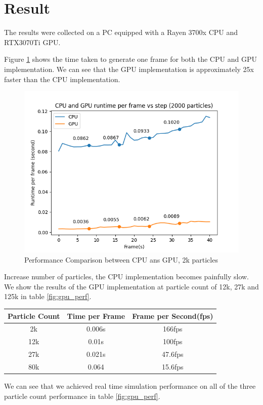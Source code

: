 \documentclass[sigconf]{acmart}
\begin{document}
\section{Result}
The results were collected on a PC equipped with a Rayen 3700x CPU and RTX3070Ti GPU.

Figure \ref{fig:perf} shows the time taken to generate one frame for both the CPU and GPU implementation. We can see that the GPU implementation is approximately 25x faster than the CPU implementation.
\begin{figure}
  \centering
  \includegraphics[width=\linewidth]{image/cpu-gpu-comprasion.png}
  \caption{Performance Comparison between CPU ans GPU, 2k particles}
\label{fig:perf}
\end{figure}

Increase number of particles, the CPU implementation becomes painfully slow. We show the results of the GPU implementation at particle count of 12k, 27k and 125k in table \ref{fig:gpu_perf}.
\begin{center}
  \begin{tabular}{| c | c | c |}
    \hline
    Particle Count & Time per Frame & Frame per Second(fps)  \\
    \hline
    2k & 0.006s & 166fps \\
    \hline
    12k & 0.01s &  100fps \\
    \hline
    27k & 0.021s & 47.6fps \\
    80k & 0.064 & 15.6fps \\
    \hline
  \end{tabular}
\end{center}
We can see that we achieved real time simulation performance on all of the three particle count performance in table \ref{fig:gpu_perf}.
\end{document}
